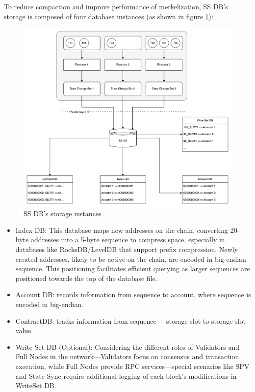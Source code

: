 To reduce compaction and improve performance of merkelization, SS DB's storage is composed of four database instances (as shown in figure \ref{fig:ss_db}):

\begin{figure}[htp]
    \centering
    \includegraphics[width=\textwidth]{sections/images/ss-db.png}
    \caption{SS DB's storage instances}
    \label{fig:ss_db}
\end{figure}

\begin{itemize}
    \item Index DB: This database maps new addresses on the chain, converting 20-byte addresses into a 5-byte sequence to compress space, especially in databases like RocksDB/LevelDB that support prefix compression. Newly created addresses, likely to be active on the chain, are encoded in big-endian sequence. This positioning facilitates efficient querying as larger sequences are positioned towards the top of the database file.
    \item Account DB: records information from sequence to account, where sequence is encoded in big-endian.
    \item ContractDB: tracks information from sequence + storage slot to storage slot value.
    \item Write Set DB (Optional): Considering the different roles of Validators and Full Nodes in the network—Validators focus on consensus and transaction execution, while Full Nodes provide RPC services—special scenarios like SPV and State Sync require additional logging of each block's modifications in WriteSet DB.
\end{itemize}

